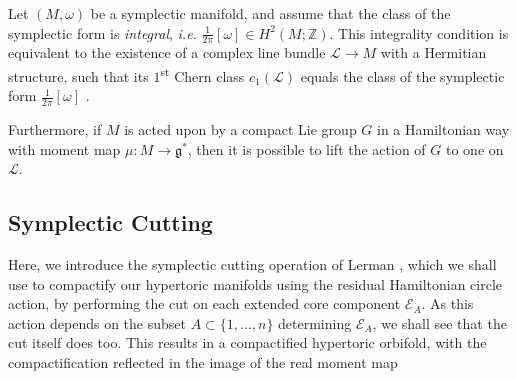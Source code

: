 \documentclass{amsart}
\newcommand{\ie}{\emph{i.e.} }
\newcommand{\ra}{\rightarrow}
\newcommand{\w}{\omega}
\newcommand{\ZZ}{\mathbb{Z}}
\newcommand{\mcE}{\mathcal{E}}
\newcommand{\mcL}{\mathcal{L}}
\newcommand{\mfg}{\mathfrak{g}}
\begin{document}
	Let $(M, \w)$ be a symplectic manifold, and assume that the class of the symplectic form is \emph{integral}, \ie $\tfrac{1}{2\pi}[\w] \in H^{2}(M; \ZZ)$. This integrality condition is equivalent to the existence of a complex line bundle $\mcL \ra M$ with a Hermitian structure, such that its $1$\textsuperscript{st} Chern class $c_{1}(\mcL)$ equals the class of the symplectic form $\tfrac{1}{2\pi}[\w]$ \cite{Duistermaat2011}.
	
	Furthermore, if $M$ is acted upon by a compact Lie group $G$ in a Hamiltonian way with moment map $\mu : M \ra \mfg^{\ast}$, then it is possible to lift the action of $G$ to one on $\mcL$. 

	\subsection{Symplectic Cutting}
	
	Here, we introduce the symplectic cutting operation of Lerman \cite{Ler95}, which we shall use to compactify our hypertoric manifolds using the residual Hamiltonian circle action, by performing the cut on each extended core component $\mcE_{A}$. As this action depends on the subset $A \subset \{1, \ldots, n\}$ determining $\mcE_{A}$, we shall see that the cut itself does too. This results in a compactified hypertoric orbifold, with the compactification reflected in the image of the real moment map 
	
\end{document}
